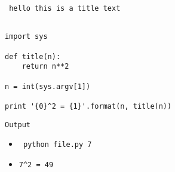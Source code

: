 \begin{center}
\texttt{ hello this is a title text}
\end{center}
\begin{verbatim}

import sys

def title(n):
	return n**2

n = int(sys.argv[1])

print '{0}^2 = {1}'.format(n, title(n))
\end{verbatim}
\begin{center}
\texttt{Output}
\end{center}
\begin{itemize}
\item[$]\texttt{ python file.py 7}
\item\texttt{7^2 = 49}
\end{itemize}
